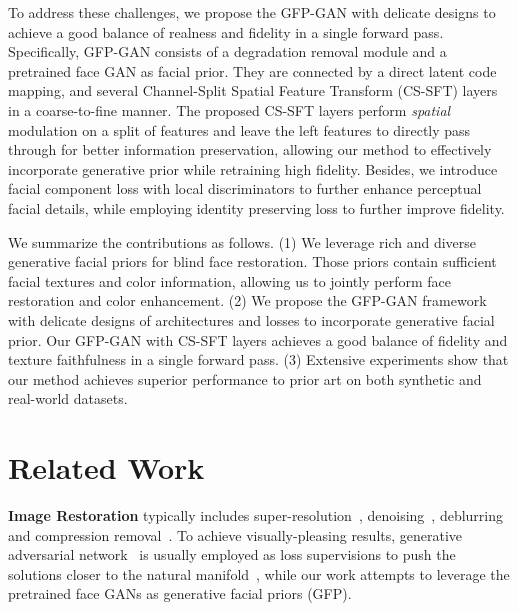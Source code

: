 \documentclass[final]{cvpr}
\begin{document}
To address these challenges, we propose the GFP-GAN with delicate designs to achieve a good balance of realness and fidelity in a single forward pass. 
Specifically, GFP-GAN consists of a degradation removal module and a pretrained face GAN as facial prior. They are connected by a direct latent code mapping, and several Channel-Split Spatial Feature Transform (CS-SFT) layers in a coarse-to-fine manner. 
The proposed CS-SFT layers perform \textit{spatial} modulation on a split of features and leave the left features to directly pass through for better information preservation, allowing our method to effectively incorporate generative prior while retraining high fidelity.
Besides, we introduce facial component loss with local discriminators to further enhance perceptual facial details, while employing identity preserving loss to further improve fidelity. 


We summarize the contributions as follows.
(1) We leverage rich and diverse generative facial priors for blind face restoration. Those priors contain sufficient facial textures and color information, allowing us to jointly perform face restoration and color enhancement. 
(2) We propose the GFP-GAN framework with delicate designs of architectures and losses to incorporate generative facial prior. Our GFP-GAN with CS-SFT layers achieves a good balance of fidelity and texture faithfulness in a single forward pass.  
(3) Extensive experiments show that our method achieves superior performance to prior art on both synthetic and real-world datasets.
 \vspace{-0.5em}
\section{Related Work}
\vspace{-0.5em}
\noindent\textbf{Image Restoration} typically includes super-resolution~\cite{dong2014learning,lim2017edsr,timofte2017ntire,liu2018non,zhang2018rcan,yu2019path,guo2020closed,liu2020residual}, denoising~\cite{zhang2017beyond,lefkimmiatis2017non,helou2020stochastic}, deblurring~\cite{xu2014deep,kupyn2018deblurgan,shen2018deep} and  compression removal~\cite{dong2015compression,guo2016building}.
To achieve visually-pleasing results, generative adversarial network~\cite{goodfellow2014gan} is usually employed as loss supervisions to push the solutions closer to the natural manifold~\cite{ledig2017srgan,sajjadi2017enhancenet,wang2018esrgan,chen2018image,galteri2017deep}, while our work attempts to leverage the pretrained face GANs as generative facial priors (GFP).
\end{document}
